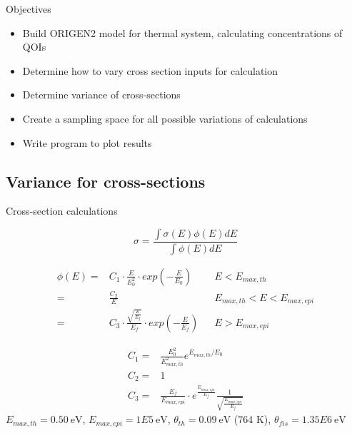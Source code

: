 \documentclass{beamer}
\newcommand{\cmark}{\ding{51}}%
\newcommand{\xmark}{\ding{55}}%
\newcommand{\done}{\rlap{$\square$}{\raisebox{2pt}{\large\hspace{1pt}\cmark}}%
  \hspace{-2.5pt}}
\newcommand{\wontfix}{\rlap{$\square$}{\large\hspace{1pt}\xmark}}
\newcommand{\ndone}{\rlap{$\square$}{\raisebox{2pt}{}}%
  \hspace{8pt}}
\begin{document}
\begin{frame}
\begin{block}{Objectives}
  \begin{itemize}
  \item[\done]{Build ORIGEN2 model for thermal system, calculating
  concentrations of QOIs}
  \item[\wontfix]{Determine how to vary cross section inputs for calculation}
  \item[\ndone]{Determine variance of cross-sections}
  \item[\ndone]{Create a sampling space for all possible variations of
    calculations}
  \item[\ndone]{Write program to plot results}
  \end{itemize}
\end{block}
\end{frame}



\subsection{Variance for cross-sections}
\begin{frame}{Cross-section calculations}

  \begin{equation*}
    \sigma=\frac{\int\sigma(E)\phi(E)dE}{\int\phi(E)dE}
  \end{equation*}

  \begin{align*}
    \phi(E) =& C_1\cdot \frac{E}{E_0^2} \cdot
    exp\left(-\frac{E}{E_0}\right) &&E<E_{max,th}\\
    =& \frac{C_2}{E}  &&E_{max,th}<E<E_{max,epi}\\
    =& C_3 \cdot \frac{\sqrt{\frac{E}{E_f}}}{E_f}
    \cdot exp\left(-\frac{E}{E_{f}}
    \right) &&E>E_{max,epi}
  \end{align*}


  {\tiny
    \setlength{\abovedisplayskip}{6pt}
    \setlength{\belowdisplayskip}{\abovedisplayskip}
    \setlength{\abovedisplayshortskip}{0pt}
    \setlength{\belowdisplayshortskip}{3pt}
    \begin{align*}
      C_1=&\frac{E_0^2}{E^2_{max,th}}e^{E_{max,th}/E_0}
      \\
      C_2=&1\\
      C_3=&\frac{E_f}{E_{max,epi}}
      \cdot
      e^{\frac{E_{max,epi}}{E_f}}\frac{1}
      {\sqrt{\frac{E_{max,epi}}{E_f}}}
    \end{align*}
    }%
  {\tiny
  $E_{max,th}=0.50\ \text{eV}$,
  $E_{max,epi}=1E5\ \text{eV}$,
  $\theta_{th}=0.09\ \text{eV}$ (764 K),
  $\theta_{fis}=1.35E6\ \text{eV}$}%
\end{frame}
\end{document}
